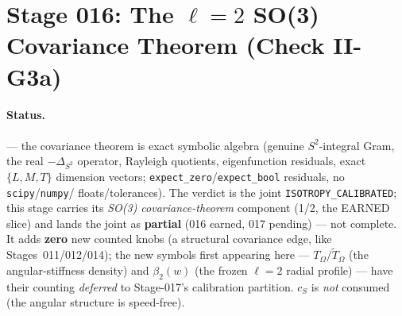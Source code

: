 \section{Stage 016: The \texorpdfstring{\(\ell=2\)}{l=2} SO(3) Covariance Theorem (Check II-G3a)}

\claimstatus{\StatusExactClosure}

\paragraph{Status.}
\StatusExactClosure{} --- the covariance theorem is exact symbolic algebra
(genuine \(S^2\)-integral Gram, the real \(-\Delta_{S^2}\) operator, Rayleigh
quotients, eigenfunction residuals, exact \(\{L,M,T\}\) dimension vectors;
\texttt{expect\_zero}/\texttt{expect\_bool} residuals, no \texttt{scipy}/\texttt{numpy}/
floats/tolerances). The verdict is the joint \texttt{ISOTROPY\_CALIBRATED}; this stage
carries its \emph{SO(3) covariance-theorem} component (1/2, the EARNED slice) and lands
the joint as \textbf{partial} (016 earned, 017 pending) --- not complete. It adds
\textbf{zero} new counted knobs (a structural covariance edge, like Stages~011/012/014);
the new symbols first appearing here --- \(T_\Omega/\tilde T_\Omega\) (the angular-stiffness
density) and \(\beta_2(w)\) (the frozen \(\ell=2\) radial profile) --- have their counting
\emph{deferred} to Stage-017's calibration partition. \(c_S\) is \emph{not} consumed
(the angular structure is speed-free).

